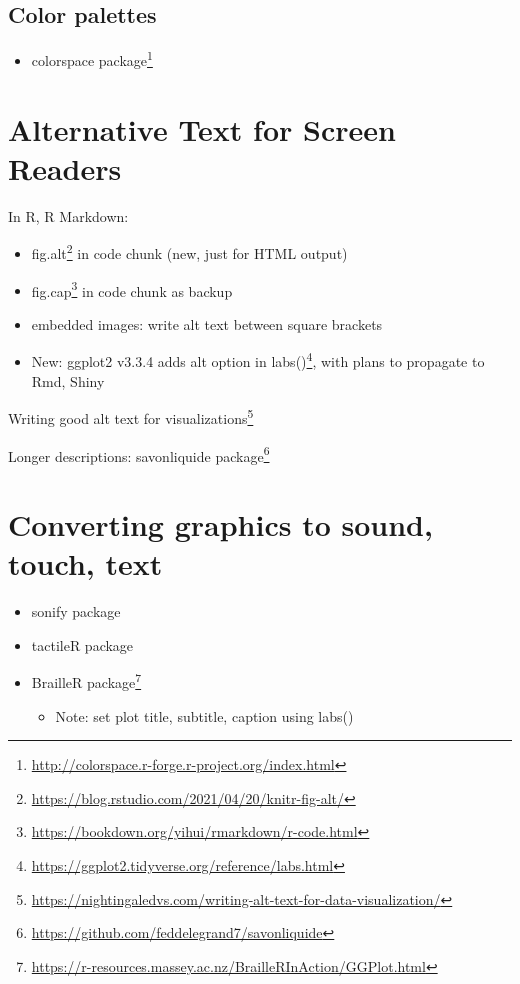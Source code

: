 \documentclass[
]{krantz}
\providecommand{\tightlist}{%
  \setlength{\itemsep}{0pt}\setlength{\parskip}{0pt}}
\renewcommand{\href}[2]{#2\footnote{\url{#1}}}
\begin{document}
\hypertarget{color-palettes}{%
\subsection{Color palettes}\label{color-palettes}}

\begin{itemize}
\tightlist
\item
  \href{http://colorspace.r-forge.r-project.org/index.html}{colorspace package}
\end{itemize}

\hypertarget{alternative-text-for-screen-readers}{%
\section{Alternative Text for Screen Readers}\label{alternative-text-for-screen-readers}}

In R, R Markdown:

\begin{itemize}
\item
  \href{https://blog.rstudio.com/2021/04/20/knitr-fig-alt/}{fig.alt} in code chunk (new, just for HTML output)
\item
  \href{https://bookdown.org/yihui/rmarkdown/r-code.html}{fig.cap} in code chunk as backup
\item
  embedded images: write alt text between square brackets
\item
  New: ggplot2 v3.3.4 adds \href{https://ggplot2.tidyverse.org/reference/labs.html}{alt option in labs()}, with plans to propagate to Rmd, Shiny
\end{itemize}

\href{https://nightingaledvs.com/writing-alt-text-for-data-visualization/}{Writing good alt text for visualizations}

Longer descriptions: \href{https://github.com/feddelegrand7/savonliquide}{savonliquide package}

\hypertarget{converting-graphics-to-sound-touch-text}{%
\section{Converting graphics to sound, touch, text}\label{converting-graphics-to-sound-touch-text}}

\begin{itemize}
\item
  sonify package
\item
  tactileR package
\item
  \href{https://r-resources.massey.ac.nz/BrailleRInAction/GGPlot.html}{BrailleR package}

  \begin{itemize}
  \tightlist
  \item
    Note: set plot title, subtitle, caption using labs()
  \end{itemize}
\end{itemize}
\end{document}
